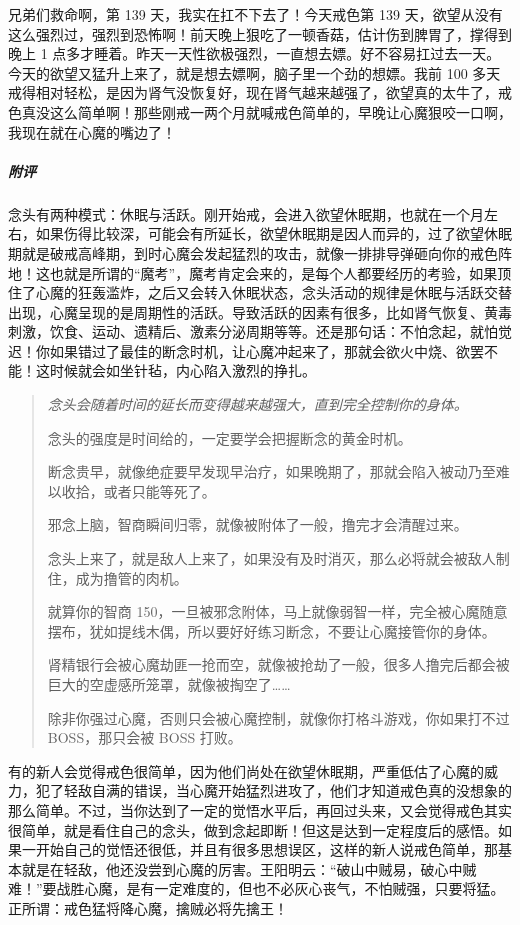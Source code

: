 \begin{case}
    兄弟们救命啊，第 139 天，我实在扛不下去了！今天戒色第 139 天，欲望从没有这么强烈过，强烈到恐怖啊！前天晚上狠吃了一顿香菇，估计伤到脾胃了，撑得到晚上 1 点多才睡着。昨天一天性欲极强烈，一直想去嫖。好不容易扛过去一天。今天的欲望又猛升上来了，就是想去嫖啊，脑子里一个劲的想嫖。我前 100 多天戒得相对轻松，是因为肾气没恢复好，现在肾气越来越强了，欲望真的太牛了，戒色真没这么简单啊！那些刚戒一两个月就喊戒色简单的，早晚让心魔狠咬一口啊，我现在就在心魔的嘴边了！
    \subparagraph{附评} 念头有两种模式：休眠与活跃。刚开始戒，会进入欲望休眠期，也就在一个月左右，如果伤得比较深，可能会有所延长，欲望休眠期是因人而异的，过了欲望休眠期就是破戒高峰期，到时心魔会发起猛烈的攻击，就像一排排导弹砸向你的戒色阵地！这也就是所谓的“魔考”，魔考肯定会来的，是每个人都要经历的考验，如果顶住了心魔的狂轰滥炸，之后又会转入休眠状态，念头活动的规律是休眠与活跃交替出现，心魔呈现的是周期性的活跃。导致活跃的因素有很多，比如肾气恢复、黄毒刺激，饮食、运动、遗精后、激素分泌周期等等。还是那句话：不怕念起，就怕觉迟！你如果错过了最佳的断念时机，让心魔冲起来了，那就会欲火中烧、欲罢不能！这时候就会如坐针毡，内心陷入激烈的挣扎。
    \begin{quotation}\it
        念头会随着时间的延长而变得越来越强大，直到完全控制你的身体。

        念头的强度是时间给的，一定要学会把握断念的黄金时机。

        断念贵早，就像绝症要早发现早治疗，如果晚期了，那就会陷入被动乃至难以收拾，或者只能等死了。

        邪念上脑，智商瞬间归零，就像被附体了一般，撸完才会清醒过来。

        念头上来了，就是敌人上来了，如果没有及时消灭，那么必将就会被敌人制住，成为撸管的肉机。

        就算你的智商 150，一旦被邪念附体，马上就像弱智一样，完全被心魔随意摆布，犹如提线木偶，所以要好好练习断念，不要让心魔接管你的身体。

        肾精银行会被心魔劫匪一抢而空，就像被抢劫了一般，很多人撸完后都会被巨大的空虚感所笼罩，就像被掏空了……

        除非你强过心魔，否则只会被心魔控制，就像你打格斗游戏，你如果打不过 BOSS，那只会被 BOSS 打败。
    \end{quotation}
    有的新人会觉得戒色很简单，因为他们尚处在欲望休眠期，严重低估了心魔的威力，犯了轻敌自满的错误，当心魔开始猛烈进攻了，他们才知道戒色真的没想象的那么简单。不过，当你达到了一定的觉悟水平后，再回过头来，又会觉得戒色其实很简单，就是看住自己的念头，做到念起即断！但这是达到一定程度后的感悟。如果一开始自己的觉悟还很低，并且有很多思想误区，这样的新人说戒色简单，那基本就是在轻敌，他还没尝到心魔的厉害。王阳明云：“破山中贼易，破心中贼难！”要战胜心魔，是有一定难度的，但也不必灰心丧气，不怕贼强，只要将猛。正所谓：戒色猛将降心魔，擒贼必将先擒王！
\end{case}

